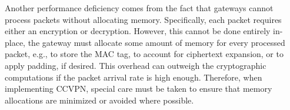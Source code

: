 Another performance deficiency comes from the fact that gateways cannot process packets
without allocating memory. Specifically, each packet requires either an encryption
or decryption. However, this cannot be done entirely in-place, the gateway must allocate some amount
of memory for every processed packet, e.g., to store the MAC tag, to account for
ciphertext expansion, or to apply padding, if desired. This overhead can outweigh
the cryptographic computations if the packet arrival rate is high enough. Therefore,
when implementing CCVPN, special care must be taken to ensure that memory allocations
are minimized or avoided where possible.
